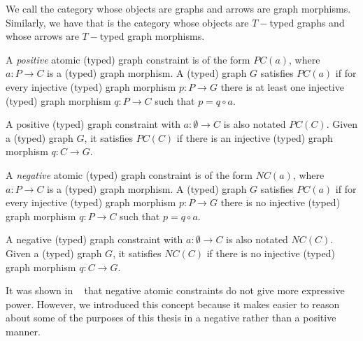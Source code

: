 \begin{remark} We call  the category whose objects are graphs and arrows are graph morphisms. Similarly, we have that  is the category whose objects are $T-$typed graphs and whose arrows are $T-$typed graph morphisms.
\end{remark}

\iffalse
\begin{definition} A \emph{positive} atomic (typed) graph constraint is of the form $PC\left(a\right)$, where $a : P \rightarrow C$ is a (typed) graph morphism. A (typed) graph $G$ satisfies $PC\left(a\right)$ if for every injective (typed) graph morphism $p : P \rightarrow G$ there is at least one injective (typed) graph morphism $q : P \rightarrow C$ such that $p = q \circ a$.

  A positive (typed) graph constraint with $a : \emptyset \rightarrow C$ is also notated $PC\left(C\right)$. Given a (typed) graph $G$, it satisfies $PC\left(C\right)$ if there is an injective (typed) graph morphism $q : C \rightarrow  G$.

\end{definition}

\begin{definition}
A \emph{negative} atomic (typed) graph constraint is of the form $NC\left(a\right)$, where $a : P \rightarrow C$ is a (typed) graph morphism. A (typed) graph $G$ satisfies $PC\left(a\right)$ if for every injective (typed) graph morphism $p : P \rightarrow G$ there is no injective (typed) graph morphism $q : P \rightarrow C$ such that $p = q \circ a$.

  A negative (typed) graph constraint with $a : \emptyset \rightarrow C$ is also notated $NC\left(C\right)$. Given a (typed) graph $G$, it satisfies $NC\left(C\right)$ if there is no injective (typed) graph morphism $q : C \rightarrow G$.


\end{definition}

\begin{remark} It was shown in ~\cite{Ehrig2006} that negative atomic constraints do not give more expressive power. However, we introduced this concept because it makes easier to reason about some of the purposes of this thesis in a negative rather than a positive manner.%
\end{remark}

